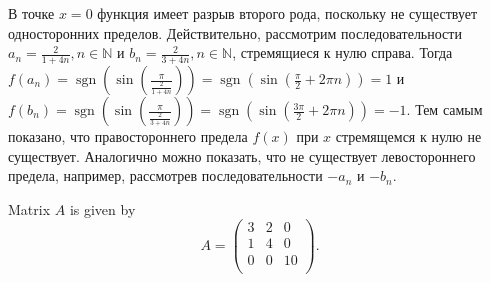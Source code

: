 \documentclass[addpoints, answers]{exam} %
\DeclareMathOperator{\sgn}{sgn}
\begin{document}
\begin{questions}
\begin{solution}
В точке $x=0$ функция имеет разрыв второго рода, поскольку не существует односторонних пределов. Действительно, рассмотрим последовательности $a_n = \frac{2}{1+4 n}, n
\in \mathbb{N}$ и $b_n = \frac{2}{3+4 n}, n \in \mathbb{N}$, стремящиеся к нулю справа. Тогда $f(a_n) = {\sgn} \left(\sin \left( \frac{\pi}{\frac{2}{1+4 n}}\right)\right) = {\sgn} \left( \sin \left( \frac{\pi}{2} + 2 \pi n \right)\right)=1$ и $f(b_n) = {\sgn} \left(\sin \left( \frac{\pi}{\frac{2}{3+4 n}}\right)\right) = {\sgn} \left( \sin \left( \frac{3 \pi}{2} + 2 \pi n \right)\right)=-1$. Тем самым показано, что правостороннего предела $f(x)$ при $x$ стремящемся к нулю не существует. Аналогично можно показать, что не существует левостороннего предела, например, рассмотрев последовательности $-a_n$ и $-b_n$.
\end{solution}





\question Matrix $A$ is given by
\[
A=\begin{pmatrix}
3 & 2 & 0 \\
1 & 4 & 0 \\
0 & 0 & 10 \\
\end{pmatrix}.
\]

\end{questions}
\end{document}
